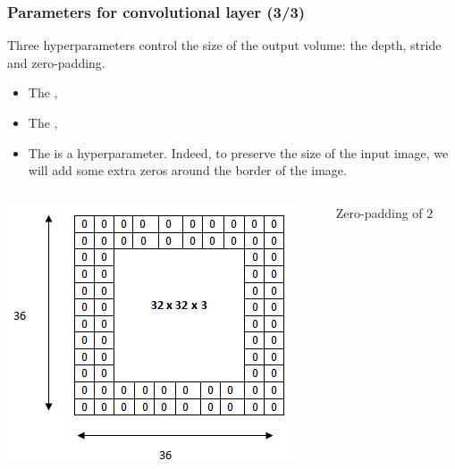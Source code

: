 \begin{frame}
	\frametitle{Parameters for convolutional layer (3/3)}

	Three hyperparameters control the size of the output volume: the depth, stride and zero-padding.

	\begin{itemize}
		\item The ,

		\item The ,

		\item The  is a hyperparameter. Indeed, to preserve the size of the input image, we will add some extra zeros around the border of the image.
	\end{itemize}

		\begin{columns}[T] %
		\hspace{0.2cm}
			\begin{column}{.5\textwidth}
			\vspace{-0.5cm}
			\begin{center}
				\includegraphics[scale=0.5]{figs/Pad}
			\end{center}
		\end{column}

	\begin{column}{.5\textwidth}
			\vspace{1.5cm}
			\hspace{1.5cm}
				Zero-padding of $2$
	\end{column}%
	\end{columns}


\end{frame}


